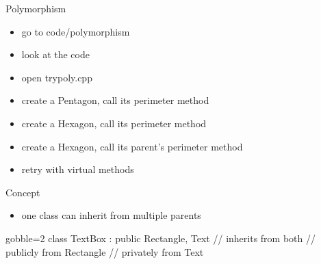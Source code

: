 \begin{frame}[fragile]
  \begin{exercise}{Polymorphism}
    \begin{itemize}
    \item go to code/polymorphism
    \item look at the code
    \item open trypoly.cpp
    \item create a Pentagon, call its perimeter method
    \item create a Hexagon, call its perimeter method
    \item create a Hexagon, call its parent's perimeter method
    \item retry with virtual methods
    \end{itemize}
  \end{exercise}
\end{frame}

\begin{frame}[fragile]
  \begin{block}{Concept}
    \begin{itemize}
    \item one class can inherit from multiple parents
    \end{itemize}
  \end{block}
  \begin{multicols}{2}
    \columnbreak
    \vspace{2cm}
    \begin{cppcode*}{gobble=2}
      class TextBox :
        public Rectangle, Text {
        // inherits from both
        // publicly from Rectangle
        // privately from Text
      }
    \end{cppcode*}
  \end{multicols}
\end{frame}

